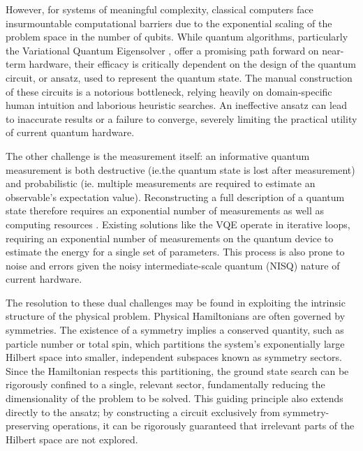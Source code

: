 \documentclass{article}
\begin{document}
However, for systems of meaningful complexity, classical computers face insurmountable computational barriers due to the exponential scaling of the problem space in the number of qubits. While quantum algorithms, particularly the Variational Quantum Eigensolver \cite{Peruzzo2014-xi},
offer a promising path forward on near-term hardware, their efficacy is critically dependent on the design of the quantum circuit, or ansatz, used to represent the quantum state. The manual construction of these circuits is a notorious bottleneck, 
relying heavily on domain-specific human intuition and laborious heuristic searches. An ineffective ansatz can lead to inaccurate results or a failure to converge, severely limiting the practical utility of current quantum hardware.

The other challenge is the measurement itself: an informative quantum measurement is both destructive (ie.the quantum state is lost after measurement) and probabilistic (ie. multiple measurements are required to estimate an observable's expectation value). Reconstructing a full description of a quantum state therefore requires an 
exponential number of measurements as well as computing resources \cite{huangPredictingManyProperties2020}. Existing solutions like the VQE operate in iterative loops, requiring an exponential number of measurements on the quantum device to estimate the energy for a single set of parameters. 
This process is also prone to noise and errors given the noisy intermediate-scale quantum (NISQ) nature of current hardware.

The resolution to these dual challenges may be found in exploiting the intrinsic structure of the physical problem. Physical Hamiltonians are often governed by symmetries. The existence of a symmetry implies a conserved quantity, such as particle number or total spin, which partitions the system's exponentially large Hilbert space into smaller, independent subspaces known as symmetry sectors. Since the Hamiltonian respects this partitioning, the ground state search can be rigorously confined to a single, relevant sector, fundamentally reducing the dimensionality of the problem to be solved. This guiding principle also extends directly to the ansatz; by constructing a circuit exclusively from symmetry-preserving operations, it can be rigorously guaranteed that irrelevant parts of the Hilbert space are not explored.
\end{document}
